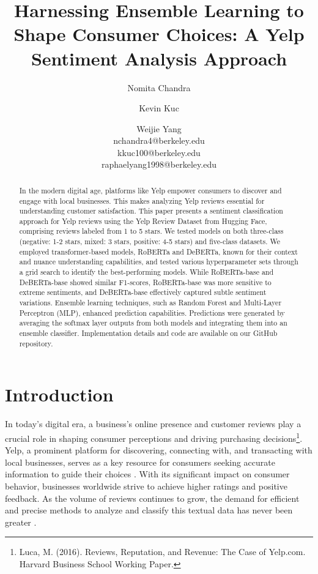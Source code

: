 \documentclass[11pt]{article}
\title{Harnessing Ensemble Learning to Shape Consumer Choices: A Yelp Sentiment Analysis Approach}
\author{Nomita Chandra \and Kevin Kuc \and Weijie Yang \\
        nchandra4@berkeley.edu \\ kkuc100@berkeley.edu \\ raphaelyang1998@berkeley.edu}
\begin{document}
\maketitle
\begin{abstract}
  In the modern digital age, platforms like Yelp empower consumers to discover and engage with local businesses. This makes analyzing Yelp reviews essential for understanding customer satisfaction. This paper presents a sentiment classification approach for Yelp reviews using the Yelp Review Dataset from Hugging Face, comprising reviews labeled from 1 to 5 stars. We tested models on both three-class (negative: 1-2 stars, mixed: 3 stars, positive: 4-5 stars) and five-class datasets. We employed transformer-based models, RoBERTa and DeBERTa, known for their context and nuance understanding capabilities, and tested various hyperparameter sets through a grid search to identify the best-performing models.  While RoBERTa-base and DeBERTa-base showed similar F1-scores, RoBERTa-base was more sensitive to extreme sentiments, and DeBERTa-base effectively captured subtle sentiment variations. Ensemble learning techniques, such as Random Forest and Multi-Layer Perceptron (MLP), enhanced prediction capabilities. Predictions were generated by averaging the softmax layer outputs from both models and integrating them into an ensemble classifier. Implementation details and code are available on our GitHub repository.
\end{abstract}

\section{Introduction}
In today’s digital era, a business's online presence and customer reviews play a crucial role in shaping consumer perceptions and driving purchasing decisions\footnote{Luca, M. (2016). Reviews, Reputation, and Revenue: The Case of Yelp.com. Harvard Business School Working Paper.}. Yelp, a prominent platform for discovering, connecting with, and transacting with local businesses, serves as a key resource for consumers seeking accurate information to guide their choices \citep{lee2014impact}. With its significant impact on consumer behavior, businesses worldwide strive to achieve higher ratings and positive feedback. As the volume of reviews continues to grow, the demand for efficient and precise methods to analyze and classify this textual data has never been greater \citep{pang2008sentiment}.
\end{document}
